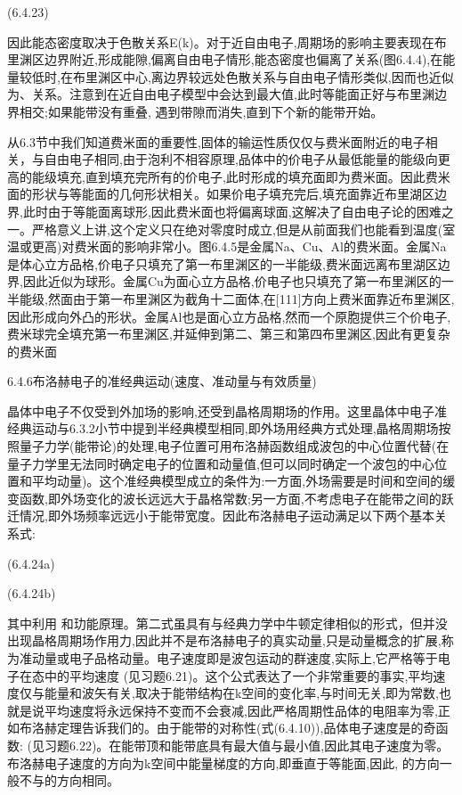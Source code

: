  	(6.4.23)



因此能态密度取决于色散关系E(k)。对于近自由电子,周期场的影响主要表现在布里渊区边界附近,形成能隙,偏离自由电子情形,能态密度也偏离了关系(图6.4.4),在能量较低时,在布里渊区中心,离边界较远处色散关系与自由电子情形类似,因而也近似为、关系。注意到在近自由电子模型中会达到最大值,此时等能面正好与布里渊边界相交;如果能带没有重叠, 遇到带隙而消失,直到下个新的能带开始。

从6.3节中我们知道费米面的重要性,固体的输运性质仅仅与费米面附近的电子相关，与自由电子相同,由于泡利不相容原理,品体中的价电子从最低能量的能级向更高的能级填充,直到填充完所有的价电子,此时形成的填充面即为费米面。因此费米面的形状与等能面的几何形状相关。如果价电子填充完后,填充面靠近布里湖区边界,此时由于等能面离球形,因此费米面也将偏离球面,这解决了自由电子论的困难之一。严格意义上讲,这个定义只在绝对零度时成立,但是从前面我们也能看到温度(室温或更高)对费米面的影响非常小。图6.4.5是金属Na、Cu、Al的费米面。金属Na是体心立方品格,价电子只填充了第一布里渊区的一半能级,费米面远离布里湖区边界,因此近似为球形。金属Cu为面心立方品格,价电子也只填充了第一布里渊区的一半能级,然面由于第一布里渊区为截角十二面体,在[111]方向上费米面靠近布里渊区,因此形成向外凸的形状。金属Al也是面心立方品格,然而一个原胞提供三个价电子,费米球完全填充第一布里渊区,并延伸到第二、第三和第四布里渊区,因此有更复杂的费米面



6.4.6布洛赫电子的准经典运动(速度、准动量与有效质量)

晶体中电子不仅受到外加场的影响,还受到晶格周期场的作用。这里晶体中电子准经典运动与6.3.2小节中提到半经典模型相同,即外场用经典方式处理,晶格周期场按照量子力学(能带论)的处理,电子位置可用布洛赫函数组成波包的中心位置代替(在量子力学里无法同时确定电子的位置和动量值,但可以同时确定一个波包的中心位置和平均动量)。这个准经典模型成立的条件为:一方面,外场需要是时间和空间的缓变函数,即外场变化的波长远远大于晶格常数;另一方面,不考虑电子在能带之间的跃迁情况,即外场频率远远小于能带宽度。因此布洛赫电子运动满足以下两个基本关系式:

 	(6.4.24a)

	 (6.4.24b)

	其中利用 和玏能原理。第二式虽具有与经典力学中牛顿定律相似的形式，但并没出现晶格周期场作用力,因此并不是布洛赫电子的真实动量,只是动量概念的扩展,称为准动量或电子品格动量。电子速度即是波包运动的群速度,实际上,它严格等于电子在态中的平均速度 (见习题6.21)。这个公式表达了一个非常重要的事实,平均速度仅与能量和波矢有关,取决于能带结构在k空间的变化率,与时间无关,即为常数,也就是说平均速度将永远保持不变而不会衰减,因此严格周期性品体的电阻率为零,正如布洛赫定理告诉我们的。由于能带的对称性(式(6.4.10)),品体电子速度是的奇函数:  (见习题6.22)。在能带顶和能带底具有最大值与最小值,因此其电子速度为零。布洛赫电子速度的方向为k空间中能量梯度的方向,即垂直于等能面,因此, 的方向一般不与的方向相同。

